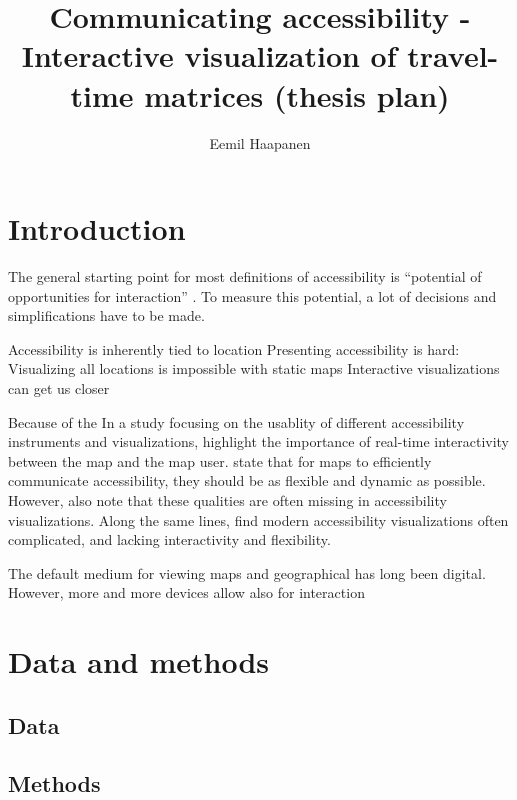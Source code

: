 \documentclass{article}
\title{Communicating accessibility - Interactive visualization of travel-time matrices (thesis  plan)}
\author{Eemil Haapanen}
\begin{document}
\maketitle

\section{Introduction}

The general starting point for most definitions of accessibility is \enquote{potential of opportunities for interaction} \parencite{han1959}.
To measure this potential, a lot of decisions and simplifications have to be made.

Accessibility is inherently tied to location
Presenting accessibility is hard:
Visualizing all locations is impossible with static maps
Interactive visualizations can get us closer

Because of the 
In a study focusing on the usablity of different accessibility instruments and visualizations,  %
\textcite{te2014} highlight the importance of real-time interactivity between the map and the map user.
\textcite{but2018} state that for maps to efficiently communicate accessibility,
they should be as flexible and dynamic as possible.
However, \citeauthor{but2018} also note that these qualities are often missing in accessibility visualizations.
Along the same lines, \textcite{paj2021} find modern accessibility visualizations often complicated,
and lacking interactivity and flexibility.


The default medium for viewing maps and geographical has long been digital.  %
However, more and more devices allow also for interaction \parencite{mei2019}



\section{Data and methods}

\subsection{Data}
\subsection{Methods}

\printbibliography
\end{document}
